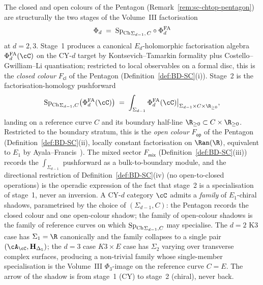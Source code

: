 \begin{remark}
\label{rem:pentagon-two-stage}
%
%
The closed and open colours of the Pentagon
(Remark~\ref{rem:sc-chtop-pentagon}) are structurally the two stages
of the Volume~III factorisation
\[
 \Phi_d \;=\; {\mathrm{Sp}_{\mathrm{Ch}}}_{\Sigma_{d-1},\,C}\circ\Phi^{\mathrm{FA}}_d
\]
at $d = 2, 3$. Stage~1 produces a canonical $E_d$-holomorphic
factorisation algebra $\PhiFA_d(\cC)$ on the CY-$d$ target by
Kontsevich--Tamarkin formality plus Costello--Gwilliam--Li
quantisation; restricted to local observables on a formal disc, this
is the \emph{closed colour} $F_{\mathsf{cl}}$ of the Pentagon
(Definition~\ref{def:BD-SC}(i)). Stage~2 is the
factorisation-homology pushforward
\[
 {\SpCh}_{\Sigma_{d-1},C}\bigl(\PhiFA_d(\cC)\bigr)
 \;=\; \int_{\Sigma_{d-1}} \PhiFA_d(\cC)\big|_{\Sigma_{d-1}\times C\times\R_{\geq 0}},
\]
landing on a reference curve $C$ and its boundary half-line
$\R_{\geq 0}\subset C\times\R_{\geq 0}$. Restricted to the
boundary stratum, this is the \emph{open colour} $F_{\mathsf{op}}$
of the Pentagon (Definition~\ref{def:BD-SC}(ii), locally constant
factorisation on $\Ran(\R)$, equivalent to $E_1$ by
Ayala--Francis~\cite{AF15}). The mixed sector $F_{\mathsf{mix}}$
(Definition~\ref{def:BD-SC}(iii)) records the $\int_{\Sigma_{d-1}}$
pushforward as a bulk-to-boundary module, and the directional
restriction of Definition~\ref{def:BD-SC}(iv) (no open-to-closed
operations) is the operadic expression of the fact that stage~2 is
a specialisation of stage~1, never an inversion. A CY-$d$ category
$\cC$ admits a \emph{family} of $E_1$-chiral shadows, parametrised
by the choice of $(\Sigma_{d-1}, C)$: the Pentagon records the
closed colour and one open-colour shadow; the family of open-colour
shadows is the family of reference curves on which
${\mathrm{Sp}_{\mathrm{Ch}}}_{\Sigma_{d-1},C}$ may specialise. The $d = 2$ K3 case has
$\Sigma_1 = \R$ canonically and the family collapses to a single
pair $(\cA_\cC, \mathbf H_{\Delta_5})$; the $d = 3$ case
$K3 \times E$
case has $\Sigma_2$ varying over transverse complex surfaces,
producing a non-trivial family whose single-member specialisation
is the Volume~III $\Phi_3$-image on the reference curve $C = E$.
The arrow of the shadow is from stage~1 (CY) to stage~2 (chiral),
never back.
\end{remark}


